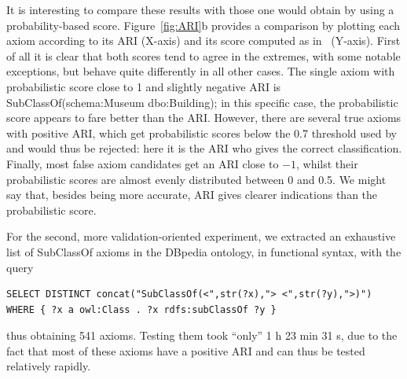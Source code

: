 \documentclass{llncs}
\begin{document}
It is interesting to compare these results with those one would obtain by using
a probability-based score. Figure~\ref{fig:ARI}b provides a comparison by plotting
each axiom according to its ARI (X-axis) and its score computed as in~\cite{BuehmannLehmann2012}
(Y-axis). First of all it is clear that both scores tend to agree in the extremes,
with some notable exceptions, but behave quite differently in all other cases.
The single axiom with probabilistic score close to 1 and slightly negative ARI
is \textsf{SubClassOf(schema:Museum dbo:Building)}; in this specific case, the
probabilistic score appears to fare better than the ARI. However, there are several
true axioms with positive ARI, which get probabilistic scores below the 0.7 threshold
used by~\cite{BuehmannLehmann2012} and would thus be rejected: here it is the ARI
who gives the correct classification.
Finally, most false axiom candidates get an ARI close to $-1$, whilst their
probabilistic scores are almost evenly distributed between 0 and 0.5. We might
say that, besides being more accurate, ARI gives clearer indications than
the probabilistic score.

For the second, more validation-oriented experiment, we extracted an exhaustive
list of \textsf{SubClassOf} axioms in the DBpedia ontology, in functional syntax, with the query
\begin{verbatim}
SELECT DISTINCT concat("SubClassOf(<",str(?x),"> <",str(?y),">)")
WHERE { ?x a owl:Class . ?x rdfs:subClassOf ?y }\end{verbatim}
thus obtaining 541 axioms. Testing them took ``only'' 1 h 23 min 31 s, due to
the fact that most of these axioms have a positive ARI and can thus be tested
relatively rapidly.


\end{document}
